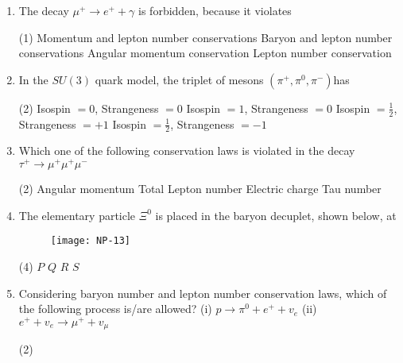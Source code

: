 \begin{enumerate}
	{}
	 \begin{tasks}(4)
		\task[\textbf{a.}]$X^{++}$
		\task[\textbf{b.}]$\mathrm{X}^{+}$
		\task[\textbf{c.}]$X^{-}$
		\task[\textbf{d.}] $\mathrm{X}^{--}$ 
	\end{tasks}
	\item  The decay $\mu^{+} \rightarrow e^{+}+\gamma$ is forbidden, because it violates
	{}
	 \begin{tasks}(1)
		\task[\textbf{a.}] Momentum and lepton number conservations
		\task[\textbf{b.}]Baryon and lepton number conservations
		\task[\textbf{c.}]Angular momentum conservation
		\task[\textbf{d.}]  Lepton number conservation
	\end{tasks}
	\item  In the $S U(3)$ quark model, the triplet of mesons $\left(\pi^{+}, \pi^0, \pi^{-}\right)$has
	{}
	 \begin{tasks}(2)
		\task[\textbf{a.}]Isospin $=0$, Strangeness $=0$
		\task[\textbf{b.}] Isospin $=1$, Strangeness $=0$
		\task[\textbf{c.}]Isospin $=\frac{1}{2}$, Strangeness $=+1$
		\task[\textbf{d.}]  Isospin $=\frac{1}{2}$, Strangeness $=-1$
	\end{tasks}
	\item  Which one of the following conservation laws is violated in the decay $\tau^{+} \rightarrow \mu^{+} \mu^{+} \mu^{-}$
	{}
	 \begin{tasks}(2)
		\task[\textbf{a.}]Angular momentum
		\task[\textbf{b.}]Total Lepton number
		\task[\textbf{c.}]Electric charge
		\task[\textbf{d.}]Tau number 
	\end{tasks}
	\item  The elementary particle $\Xi^0$ is placed in the baryon decuplet, shown below, at
		{}
	\begin{figure}[H]
		\centering
		\texttt{[image: NP-13]}
	\end{figure}
	 \begin{tasks}(4)
		\task[\textbf{a.}]$P$
		\task[\textbf{b.}]$Q$
		\task[\textbf{c.}]$R$
		\task[\textbf{d.}] $S$ 
	\end{tasks}
	\item  Considering baryon number and lepton number conservation laws, which of the following process is/are allowed?
	(i) $p \rightarrow \pi^0+e^{+}+v_e$\hspace{2cm}
	(ii) $e^{+}+v_e \rightarrow \mu^{+}+v_\mu$
	{}
	 \begin{tasks}(2)

\end{tasks}
\end{enumerate}

